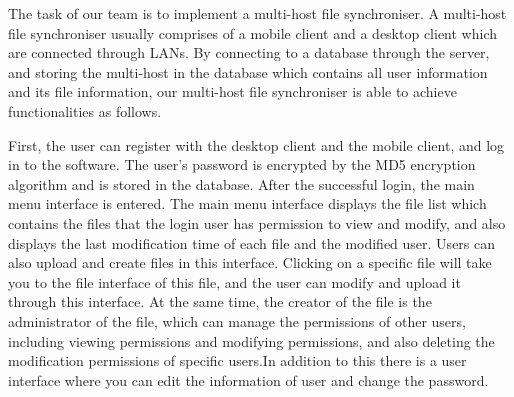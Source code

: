 

\noindent The task of our team is to implement a multi-host file synchroniser. A multi-host file synchroniser usually comprises of a mobile client and a desktop client which are connected through LANs. By connecting to a database through the server, and storing the multi-host in the database which contains all user information and its file information, our multi-host file synchroniser is able to achieve functionalities as follows.



\vspace{0.2cm}
\noindent First, the user can register with the desktop client and the mobile client, and log in to the software. The user's password is encrypted by the MD5 encryption algorithm and is stored in the database. After the successful login, the main menu interface is entered. The main menu interface displays the file list which contains the files that the login user has permission to view and modify, and also displays the last modification time of each file and the modified user. Users can also upload and create files in this interface. Clicking on a specific file will take you to the file interface of this file, and the user can modify and upload it through this interface. At the same time, the creator of the file is the administrator of the file, which can manage the permissions of other users, including viewing permissions and modifying permissions, and also deleting the modification permissions of specific users.In addition to this there is a user interface where you can edit the information of user and change the password.

 
